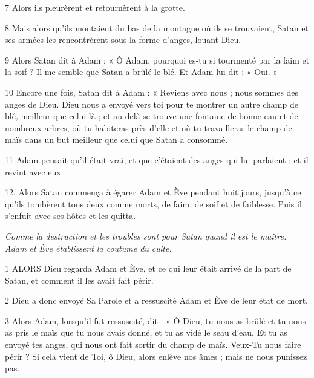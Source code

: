 \par 7 Alors ils pleurèrent et retournèrent à la grotte.

\par 8 Mais alors qu'ils montaient du bas de la montagne où ils se trouvaient, Satan et ses armées les rencontrèrent sous la forme d'anges, louant Dieu.

\par 9 Alors Satan dit à Adam : « Ô Adam, pourquoi es-tu si tourmenté par la faim et la soif ? Il me semble que Satan a brûlé le blé. Et Adam lui dit : « Oui. »

\par 10 Encore une fois, Satan dit à Adam : « Reviens avec nous ; nous sommes des anges de Dieu. Dieu nous a envoyé vers toi pour te montrer un autre champ de blé, meilleur que celui-là ; et au-delà se trouve une fontaine de bonne eau et de nombreux arbres, où tu habiteras près d'elle et où tu travailleras le champ de maïs dans un but meilleur que celui que Satan a consommé.

\par 11 Adam pensait qu'il était vrai, et que c'étaient des anges qui lui parlaient ; et il revint avec eux.

\par 12. Alors Satan commença à égarer Adam et Ève pendant huit jours, jusqu'à ce qu'ils tombèrent tous deux comme morts, de faim, de soif et de faiblesse. Puis il s'enfuit avec ses hôtes et les quitta.


\par \textit{Comme la destruction et les troubles sont pour Satan quand il est le maître. Adam et Ève établissent la coutume du culte.}

\par 1 ALORS Dieu regarda Adam et Ève, et ce qui leur était arrivé de la part de Satan, et comment il les avait fait périr.

\par 2 Dieu a donc envoyé Sa Parole et a ressuscité Adam et Ève de leur état de mort.

\par 3 Alors Adam, lorsqu'il fut ressuscité, dit : « Ô Dieu, tu nous as brûlé et tu nous as pris le maïs que tu nous avais donné, et tu as vidé le seau d'eau. Et tu as envoyé tes anges, qui nous ont fait sortir du champ de maïs. Veux-Tu nous faire périr ? Si cela vient de Toi, ô Dieu, alors enlève nos âmes ; mais ne nous punissez pas.

